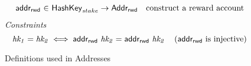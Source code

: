 \begin{figure*}[hbt]
  \begin{equation*}
    \begin{array}{r@{~\in~}lr}
      \fun{addr_{rwd}}
        & \HashKey_{stake} \to \AddrRWD
        & \text{construct a reward account}
    \end{array}
  \end{equation*}
  \emph{Constraints}
  \begin{equation*}
    \mathit{hk_1} = \mathit{hk_2} \iff \mathsf{addr_{rwd}}~\mathit{hk_2} = \mathsf{addr_{rwd}}~\mathit{hk_2}
    ~~~ \left( \mathsf{addr_{rwd}} \text{ is injective} \right)
  \end{equation*}
  \caption{Definitions used in Addresses}
  \label{fig:defs:addresses}
\end{figure*}

\clearpage

